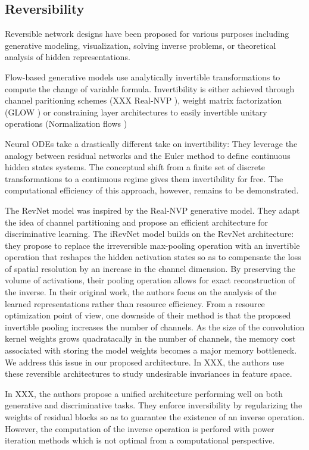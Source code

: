 \documentclass[twocolumn]{bmcart}
\begin{document}
\subsection{Reversibility}

Reversible network designs have been proposed for various purposes including generative modeling, visualization, solving inverse problems, or theoretical analysis of hidden representations.

Flow-based generative models use analytically invertible transformations to compute the change of variable formula. Invertibility is either achieved through channel paritioning schemes (XXX \cite{} Real-NVP \cite{}), weight matrix factorization (GLOW \cite{}) or constraining layer architectures to easily invertible unitary operations (Normalization flows \cite{})

Neural ODEs take a drastically different take on invertibility: They leverage the analogy between residual networks and the Euler method to define continuous hidden states systems.
The conceptual shift from a finite set of discrete transformations to a continuous regime gives them invertibility for free. 
The computational efficiency of this approach, however, remains to be demonstrated.

The RevNet model \cite{} was inspired by the Real-NVP generative model. They adapt the idea of channel partitioning and propose an efficient architecture for discriminative learning.
The iRevNet model builds on the RevNet architecture: they propose to replace the irreversible max-pooling operation with an invertible operation that reshapes the hidden activation states
so as to compensate the loss of spatial resolution by an increase in the channel dimension. 
By preserving the volume of activations, their pooling operation allows for exact reconstruction of the inverse.
In their original work, the authors focus on the analysis of the learned representations rather than resource efficiency.
From a resource optimization point of view, one downside of their method is that the proposed invertible pooling increases the number of channels.
As the size of the convolution kernel weights grows quadratacally in the number of channels, the memory cost associated with storing the model weights becomes a major memory bottleneck.
We address this issue in our proposed architecture.
In XXX, the authors use these reversible architectures to study undesirable invariances in feature space.

In XXX, the authors propose a unified architecture performing well on both generative and discriminative tasks.
They enforce inversibility by regularizing the weights of residual blocks so as to guarantee the existence of an inverse operation.
However, the computation of the inverse operation is perfored with power iteration methods which is not optimal from a computational perspective.
\end{document}
